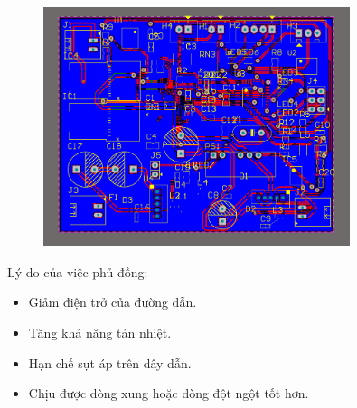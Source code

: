 \begin{figure}[H]
    \centering
    \includegraphics[width=0.8\textwidth]{pictures/7k.png}
\end{figure}
\cleardoublepage
Lý do của việc phủ đồng:
\begin{itemize}
    \item Giảm điện trở của đường dẫn.
    \item Tăng khả năng tản nhiệt.
    \item Hạn chế sụt áp trên dây dẫn.
    \item Chịu được dòng xung hoặc dòng đột ngột tốt hơn.
\end{itemize}